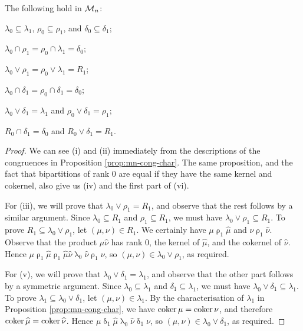 \begin{lemma}
  \label{lem:mn-lattice-inter}
  The following hold in $\mathcal{M}_n$:
  \begin{enumerate}[\rm(i)]
    \begin{multicols}{2}
    \item $\lambda_0 \subseteq \lambda_1$, $\rho_0 \subseteq \rho_1$, and
      $\delta_0 \subseteq \delta_1$;
    \item $\lambda_0 \cap \rho_1 = \rho_0 \cap \lambda_1 = \delta_0$;
    \item $\lambda_0 \vee \rho_1 = \rho_0 \vee \lambda_1 = R_1$;
    \item $\lambda_0 \cap \delta_1 = \rho_0 \cap \delta_1 = \delta_0$;
    \item $\lambda_0 \vee \delta_1 = \lambda_1$ and
      $\rho_0 \vee \delta_1 = \rho_1$;
    \item $R_0 \cap \delta_1 = \delta_0$ and $R_0 \vee \delta_1 = R_1$.
    \end{multicols}
  \end{enumerate}
  \begin{proof}
    We can see (i) and (ii) immediately from the descriptions of the congruences
    in Proposition \ref{prop:mn-cong-char}.  The same proposition, and the fact
    that bipartitions of rank $0$ are equal if they have the same kernel and
    cokernel, also give us (iv) and the first part of (vi).

    For (iii), we will prove that $\lambda_0 \vee \rho_1 = R_1$, and observe
    that the rest follows by a similar argument.  Since
    $\lambda_0 \subseteq R_1$ and $\rho_1 \subseteq R_1$, we must have
    $\lambda_0 \vee \rho_1 \subseteq R_1$.  To prove
    $R_1 \subseteq \lambda_0 \vee \rho_1$, let $(\mu, \nu) \in R_1$.  We
    certainly have $\mu \mathrel\rho_1 \widehat\mu$ and
    $\nu \mathrel\rho_1 \widehat\nu$.  Observe that the product
    $\widehat\mu\widehat\nu$ has rank $0$, the kernel of $\widehat\mu$, and the
    cokernel of $\widehat\nu$.  Hence
    $\mu \mathrel\rho_1 \widehat\mu \mathrel\rho_1 \widehat\mu\widehat\nu
    \mathrel\lambda_0 \widehat\nu \mathrel\rho_1 \nu$, so
    $(\mu, \nu) \in \lambda_0 \vee \rho_1$, as required.

    For (v), we will prove that $\lambda_0 \vee \delta_1 = \lambda_1$, and
    observe that the other part follows by a symmetric argument.  Since
    $\lambda_0 \subseteq \lambda_1$ and $\delta_1 \subseteq \lambda_1$, we must
    have $\lambda_0 \vee \delta_1 \subseteq \lambda_1$.  To prove
    $\lambda_1 \subseteq \lambda_0 \vee \delta_1$, let
    $(\mu, \nu) \in \lambda_1$.  By the characterisation of $\lambda_1$ in
    Proposition \ref{prop:mn-cong-char}, we have $\operatorname{coker}\mu = \operatorname{coker}\nu$, and
    therefore $\operatorname{coker}\widehat\mu = \operatorname{coker}\widehat\nu$.  Hence
    $\mu \mathrel\delta_1 \widehat\mu \mathrel\lambda_0 \widehat\nu
    \mathrel\delta_1 \nu$, so $(\mu, \nu) \in \lambda_0 \vee \delta_1$, as
    required.


\end{proof}
\end{lemma}

